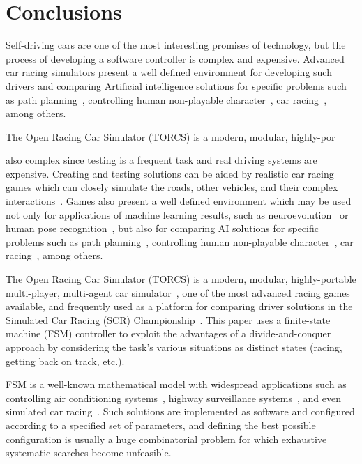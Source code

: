 \section{Conclusions}\label{sec:5}
Self-driving cars are one of the most interesting promises of technology, but the process of developing a software controller  is complex and expensive. Advanced car racing simulators present a well defined environment for developing such drivers and comparing Artificial intelligence solutions for specific problems such as path planning~\cite{deFreitas:2012}, controlling human non-playable character~\cite{simon2008}, car racing~\cite{2009}, among others.

The Open Racing Car Simulator (TORCS) is a modern, modular, highly-por

also complex since testing is a frequent task and real driving systems are expensive. Creating and testing solutions can be aided by realistic car racing games which can closely simulate the roads, other vehicles, and their complex interactions~\cite{caldeira2013torcs}. Games also present a well defined environment which may be used not only for applications of machine learning results, such as neuroevolution~\cite{stanley_real-time_2005,5482132} or human pose recognition~\cite{Shotton:2011}, but also for comparing AI solutions for specific problems such as path planning~\cite{deFreitas:2012}, controlling human non-playable character~\cite{simon2008}, car racing~\cite{2009}, among others.

The Open Racing Car Simulator (TORCS) is a modern, modular, highly-portable multi-player, multi-agent car simulator~\cite{SIMUTORCS}, one of the most advanced racing games available, and frequently used as a platform for comparing driver solutions in the Simulated Car Racing (SCR) Championship~\cite{2009,Loiacono:2012:LEA:2212908.2212953}. This paper uses a finite-state machine (FSM) controller to exploit the advantages of a divide-and-conquer approach by considering the task's various situations as distinct states (racing, getting back on track, etc.).

FSM is a well-known mathematical model with widespread applications such as controlling air conditioning systems~\cite{BERNARD}, highway surveillance systems~\cite{DOHYUN}, and even simulated car racing~\cite{DIEGO}. Such solutions are implemented as software and configured according to a specified set of parameters, and defining the best possible configuration is usually a huge combinatorial problem for which exhaustive systematic searches become unfeasible.

